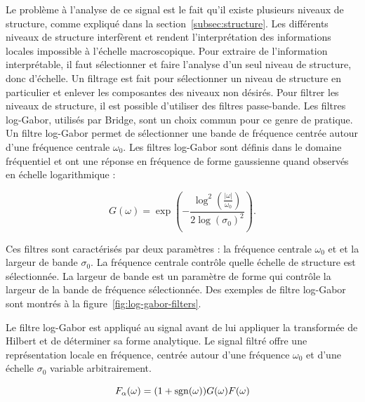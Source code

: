 Le problème à l'analyse de ce signal est le fait qu'il existe plusieurs niveaux de structure, comme expliqué dans la section~\ref{subsec:structure}. Les différents niveaux de structure interfèrent et rendent l'interprétation des informations locales impossible à l'échelle macroscopique. Pour extraire de l'information interprétable, il faut sélectionner et faire l'analyse d'un seul niveau de structure, donc d'échelle. Un filtrage est fait pour sélectionner un niveau de structure en particulier et enlever les composantes des niveaux non désirés. Pour filtrer les niveaux de structure, il est possible d'utiliser des filtres passe-bande. Les filtres log-Gabor, utilisés par Bridge, sont un choix commun pour ce genre de pratique. Un filtre log-Gabor permet de sélectionner une bande de fréquence centrée autour d'une fréquence centrale $\omega_0$. Les filtres log-Gabor sont définis dans le domaine fréquentiel et ont une réponse en fréquence de forme gaussienne quand observés en échelle logarithmique :

\begin{equation}
    G(\omega) = \exp\left(-\frac{\log^2(\frac{|\omega|}{\omega_0})}{2\log(\sigma_0)^2}\right).
\end{equation}

\noindent Ces filtres sont caractérisés par deux paramètres : la fréquence centrale $\omega_0$ et et la largeur de bande $\sigma_0$. La fréquence centrale contrôle quelle échelle de structure est sélectionnée. La largeur de bande est un paramètre de forme qui contrôle la largeur de la bande de fréquence sélectionnée. Des exemples de filtre log-Gabor sont montrés à la figure~\ref{fig:log-gabor-filters}.

\bigskip

Le filtre log-Gabor est appliqué au signal avant de lui appliquer la transformée de Hilbert et de déterminer sa forme analytique. Le signal filtré offre une représentation locale en fréquence, centrée autour d'une fréquence $\omega_0$ et d'une échelle $\sigma_0$ variable arbitrairement.

\begin{equation}
    F_{\alpha}(\omega) = (1+\operatorname{sgn}(\omega))G(\omega)F(\omega)
\end{equation}

